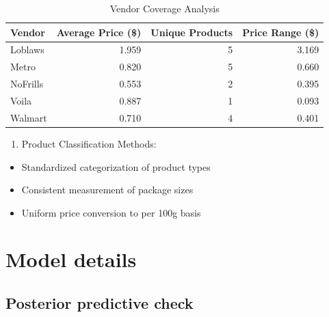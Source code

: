 \documentclass[
  letterpaper,
  DIV=11,
  numbers=noendperiod]{scrartcl}
\providecommand{\tightlist}{%
  \setlength{\itemsep}{0pt}\setlength{\parskip}{0pt}}\usepackage{longtable,booktabs,array}
\begin{document}
\begin{longtable}[t]{lrrr}

\caption{\label{tbl-vendor-coverage}Vendor Coverage Analysis}

\tabularnewline

\toprule
Vendor & Average Price (\$) & Unique Products & Price Range (\$)\\
\midrule
Loblaws & 1.959 & 5 & 3.169\\
Metro & 0.820 & 5 & 0.660\\
NoFrills & 0.553 & 2 & 0.395\\
Voila & 0.887 & 1 & 0.093\\
Walmart & 0.710 & 4 & 0.401\\
\bottomrule

\end{longtable}

\begin{enumerate}
\def\labelenumi{\arabic{enumi}.}
\setcounter{enumi}{2}
\tightlist
\item
  Product Classification Methods:
\end{enumerate}

\begin{itemize}
\tightlist
\item
  Standardized categorization of product types
\item
  Consistent measurement of package sizes
\item
  Uniform price conversion to per 100g basis
\end{itemize}

\section{Model details}\label{sec-appB}

\subsection{Posterior predictive
check}\label{posterior-predictive-check}
\end{document}
